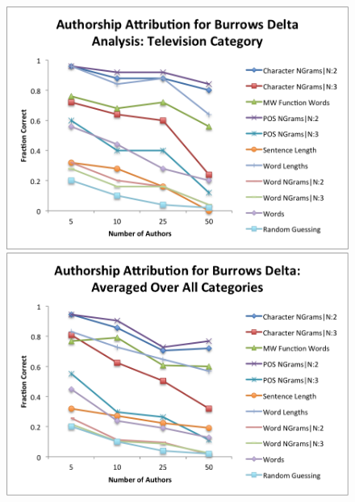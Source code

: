 \documentclass[pageno]{jpaper}
\begin{document}
\begin{figure}[h!]
\begin{center}
\includegraphics*[scale=.75]{BDTelevision}
\includegraphics*[scale=.75]{BDAll}
\end{center}
\label{fig:BDCategories3}
\end{figure}
\end{document}
